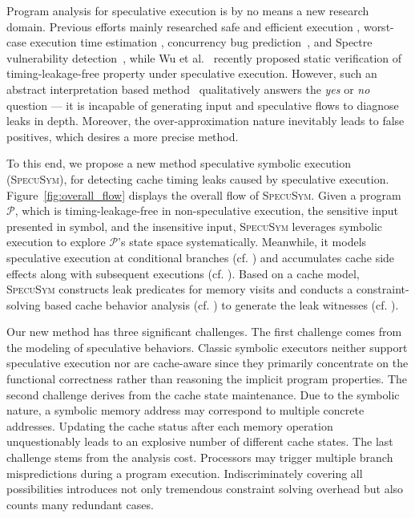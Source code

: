 \documentclass[sigconf]{acmart}
\newcommand*\circled[1]{\tikz[baseline=(char.base)]{
				\node[shape=circle,draw,inner sep=1pt] (char) {\scriptsize{#1}};}}
\newcommand{\prog}{\mathcal{P}}
\begin{document}
Program analysis for speculative execution is by no means a new research domain. 
Previous efforts mainly researched safe and efficient execution
\cite{ChenLDHY04,PrabhuRV10,GuarnieriKMRS19}, worst-case execution time estimation
\cite{LiMR03,LiMR05}, concurrency bug prediction~\cite{ChenWYS09,LiELS05}, and 
Spectre vulnerability detection~\cite{GuarnieriKMRS19,OleksenkoTSF19,WangCBMR19}, 
while Wu et al.~\cite{WuW19} recently proposed static verification of timing-leakage-free 
property under speculative execution. However, such an abstract interpretation based 
method~\cite{WuW19} qualitatively answers the \textit{yes} or \textit{no} question 
--- it is incapable of generating input and speculative flows to diagnose leaks in 
depth. Moreover, the over-approximation nature inevitably leads to false positives, 
which desires a more precise method.



To this end, we propose a new method speculative symbolic execution 
(\textsc{SpecuSym}), for detecting cache timing leaks caused by speculative 
execution. Figure~\ref{fig:overall_flow} displays the overall flow of 
\textsc{SpecuSym}. Given a program $\prog$, which is timing-leakage-free in 
non-speculative execution, the sensitive input presented in symbol, and the 
insensitive input, \textsc{SpecuSym} leverages symbolic execution to explore 
$\prog$'s state space systematically. Meanwhile, it models speculative execution 
at conditional branches (cf. \circled{1}) and accumulates cache side effects
along with subsequent executions (cf. \circled{2}). Based on a cache model, 
\textsc{SpecuSym} constructs leak predicates for memory visits and conducts a 
constraint-solving based cache behavior analysis (cf. \circled{3}) to generate 
the leak witnesses (cf. \circled{4}). 


Our new method has three significant challenges. The first challenge comes from 
the modeling of speculative behaviors. Classic symbolic executors
\cite{CadarDE08,PasareanuR10} 
neither support speculative execution nor are cache-aware since they primarily 
concentrate on the functional correctness rather than reasoning the implicit 
program properties. 
%
The second challenge derives from the cache state maintenance. Due to the symbolic 
nature, a symbolic memory address may correspond to multiple concrete addresses. 
Updating the cache status after each memory operation unquestionably leads to an 
explosive number of different cache states. 
%
The last challenge stems from the analysis cost. Processors may trigger multiple 
branch mispredictions during a program execution. Indiscriminately covering all 
possibilities introduces not only tremendous constraint solving overhead but also 
counts many redundant cases. 
\end{document}

